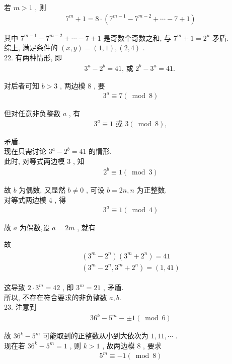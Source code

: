 若 $m>1$ , 则
\begin{align*}
	7^{m}+1=8 \cdot\left(7^{m-1}-7^{m-2}+\cdots-7+1\right)
\end{align*}

其中 $7^{m-1}-7^{m-2}+\cdots-7+1$ 是奇数个奇数之和, 与 $7^{m}+1=2^{u}$ 矛盾.\\
综上, 满足条件的 $(x, y)=(1,1),(2,4)$ . \\
22. 有两种情形, 即
\begin{align*}
	3^{a}-2^{b}=41 \text {, 或 } 2^{b}-3^{a}=41 \text {. }
\end{align*}

对后者可知 $b>3$ , 两边模 8 , 要
\begin{align*}
	3^{a} \equiv 7(\bmod 8)
\end{align*}

但对任意非负整数 $a$ , 有
\begin{align*}
	3^{a} \equiv 1 \text { 或 } 3(\bmod 8),
\end{align*}

矛盾.\\
现在只需讨论 $3^{a}-2^{b}=41$ 的情形. \\
此时, 对等式两边模 3 , 知
\begin{align*}
	2^{b} \equiv 1(\bmod 3)
\end{align*}

故 $b$ 为偶数, 又显然 $b \neq 0$ , 可设 $b=2 n, n$ 为正整数. \\
对等式两边模 4 , 得
\begin{align*}
	3^{a} \equiv 1(\bmod 4)
\end{align*}

故 $a$ 为偶数,设 $a=2 m$ , 就有

故
\begin{align*}
	\begin{gathered}
		\left(3^{m}-2^{n}\right)\left(3^{m}+2^{n}\right)=41 \\
		\left(3^{m}-2^{n}, 3^{m}+2^{n}\right)=(1,41)
	\end{gathered}
\end{align*}

这导致 $2 \cdot 3^{m}=42$ , 即 $3^{m}=21$ , 矛盾. \\
所以, 不存在符合要求的非负整数 $a ,  b$.\\
23. 注意到
\begin{align*}
	36^{k}-5^{m} \equiv \pm 1(\bmod 6)
\end{align*}

故 $36^{k}-5^{m}$ 可能取到的正整数从小到大依次为 $1,11, \cdots$ . \\
现在若 $36^{k}-5^{m}=1$ , 则 $k>1$ , 故两边模 8 , 要求
\begin{align*}
	5^{m} \equiv-1(\bmod 8)
\end{align*}

